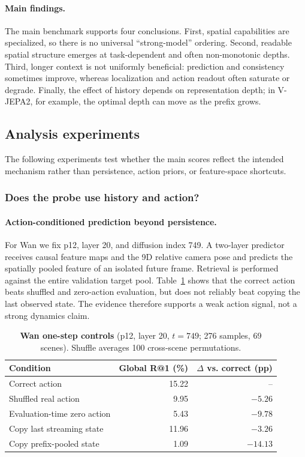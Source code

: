 \paragraph{Main findings.}
The main benchmark supports four conclusions.  First, spatial capabilities are
specialized, so there is no universal ``strong-model'' ordering.  Second,
readable spatial structure emerges at task-dependent and often non-monotonic
depths.  Third, longer context is not uniformly beneficial: prediction and
consistency sometimes improve, whereas localization and action readout often
saturate or degrade.  Finally, the effect of history depends on representation
depth; in V-JEPA2, for example, the optimal depth can move as the prefix grows.

\subsection{Analysis experiments}
\label{sec:analysis-experiments}

The following experiments test whether the main scores reflect the intended
mechanism rather than persistence, action priors, or feature-space shortcuts.

\subsubsection{Does the probe use history and action?}
\label{sec:analysis-controls}

\paragraph{Action-conditioned prediction beyond persistence.}
For Wan we fix p12, layer 20, and diffusion index 749.  A two-layer predictor
receives causal feature maps and the 9D relative camera pose and predicts the
spatially pooled feature of an isolated future frame.  Retrieval is performed
against the entire validation target pool.  Table~\ref{tab:wan-c1-controls}
shows that the correct action beats shuffled and zero-action evaluation, but
does not reliably beat copying the last observed state.  The evidence therefore
supports a weak action signal, not a strong dynamics claim.

\begin{table}[t]
  \centering
  \caption{\textbf{Wan one-step controls} (p12, layer 20, $t=749$; 276 samples,
  69 scenes).  Shuffle averages 100 cross-scene permutations.}
  \label{tab:wan-c1-controls}
  \small
  \begin{tabularx}{\columnwidth}{@{}Xrr@{}}
    \toprule
    Condition & Global R@1 (\%) & $\Delta$ vs. correct (pp) \\
    \midrule
    Correct action & 15.22 & -- \\
    Shuffled real action & 9.95 & $-5.26$ \\
    Evaluation-time zero action & 5.43 & $-9.78$ \\
    Copy last streaming state & 11.96 & $-3.26$ \\
    Copy prefix-pooled state & 1.09 & $-14.13$ \\
    \bottomrule
  \end{tabularx}
\end{table}

